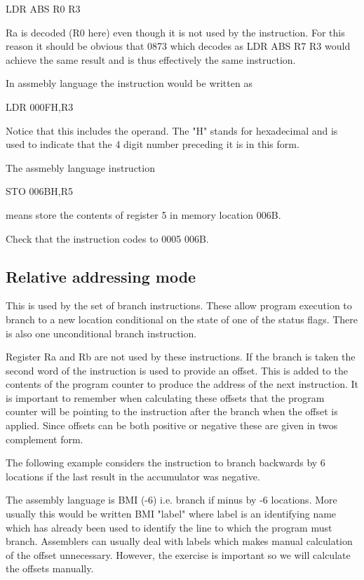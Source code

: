 \documentclass{article}
\begin{document}
\qquad LDR ABS R0 R3

Ra is decoded (R0 here) even though it is not used by the instruction. For this reason it should be obvious that 0873 which decodes as LDR ABS R7 R3 would achieve the same result and is thus effectively the same instruction.

In assmebly language the instruction would be written as

\qquad LDR 000FH,R3

Notice that this includes the operand. The "H" stands for hexadecimal and is used to indicate that the 4 digit number preceding it is in this form.

The assmebly language instruction

\qquad STO 006BH,R5

means store the contents of register 5 in memory location 006B.

Check that the instruction codes to 0005 006B.

\subsection{Relative addressing mode}

This is used by the set of branch instructions. These allow program execution to branch to a new location conditional on the state of one of the status flags. There is also one unconditional branch instruction.

Register Ra and Rb are not used by these instructions. If the branch is taken the second word of the instruction is used to provide an offset. This is added to the contents of the program counter to produce the address of the next instruction. It is important to remember when calculating these offsets that the program counter will be pointing to the instruction after the branch when the offset is applied. Since offsets can be both positive or negative these are given in twos complement form.

The following example considers the instruction to branch backwards by 6 locations if the last result in the accumulator was negative.

The assembly language is BMI (-6) i.e. branch if minus by -6 locations. More usually this would be written BMI "label" where label is an identifying name which has already been used to identify the line to which the program must branch. Assemblers can usually deal with labels which makes manual calculation of the offset unnecessary. However, the exercise is important so we will calculate the offsets manually.
\end{document}
